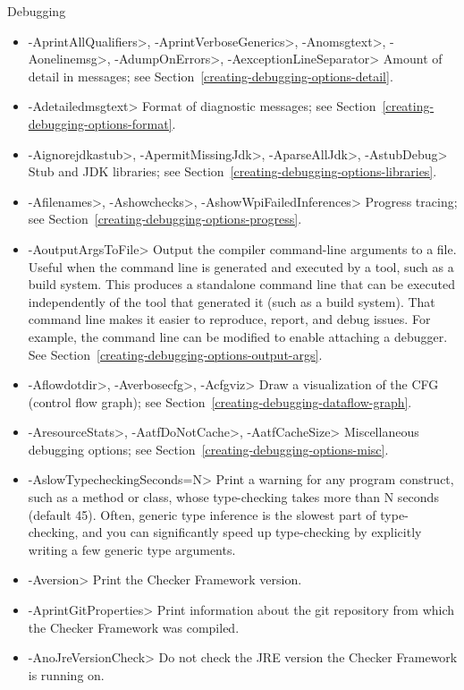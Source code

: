 Debugging
\begin{itemize}
\item
 \<-AprintAllQualifiers>,
 \<-AprintVerboseGenerics>,
 \<-Anomsgtext>,
 \<-Aonelinemsg>,
 \<-AdumpOnErrors>,
 \<-AexceptionLineSeparator>
Amount of detail in messages; see Section~\ref{creating-debugging-options-detail}.

\item
 \<-Adetailedmsgtext>
Format of diagnostic messages; see Section~\ref{creating-debugging-options-format}.

\item
 \<-Aignorejdkastub>,
 \<-ApermitMissingJdk>,
 \<-AparseAllJdk>,
 \<-AstubDebug>
Stub and JDK libraries; see Section~\ref{creating-debugging-options-libraries}.

\item
 \<-Afilenames>,
 \<-Ashowchecks>,
 \<-AshowWpiFailedInferences>
Progress tracing; see Section~\ref{creating-debugging-options-progress}.

\item
\<-AoutputArgsToFile>
Output the compiler command-line arguments to a file.  Useful when the
command line is generated and executed by a tool, such as a build system.
This produces a standalone command line that can be executed independently
of the tool that generated it (such as a build system).
That command line makes it easier to reproduce, report, and debug issues.
For example, the command line can be modified to enable attaching a debugger.
See Section~\ref{creating-debugging-options-output-args}.

\item
 \<-Aflowdotdir>,
 \<-Averbosecfg>,
 \<-Acfgviz>
 Draw a visualization of the CFG (control flow graph); see
 Section~\ref{creating-debugging-dataflow-graph}.

\item
 \<-AresourceStats>,
 \<-AatfDoNotCache>,
 \<-AatfCacheSize>
Miscellaneous debugging options; see Section~\ref{creating-debugging-options-misc}.

\item
 \<-AslowTypecheckingSeconds=N>
Print a warning for any program construct, such as a method or class, whose
type-checking takes more than N seconds (default 45).
Often, generic type inference is the slowest part of type-checking, and you
can significantly speed up type-checking by explicitly writing a few
generic type arguments.

\item
 \<-Aversion>
Print the Checker Framework version.

\item
 \<-AprintGitProperties>
Print information about the git repository from which the Checker Framework
was compiled.

\item
 \<-AnoJreVersionCheck>
Do not check the JRE version the Checker Framework is running on.
\end{itemize}

